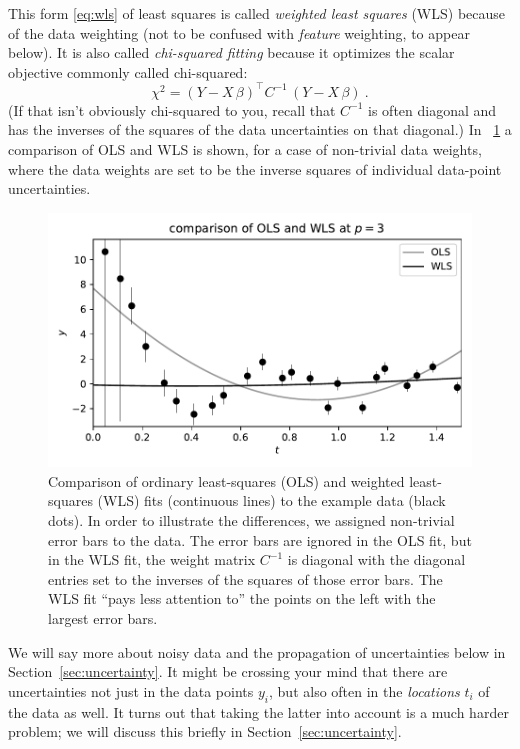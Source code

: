 \documentclass[12pt,letterpaper]{article}
\newlength{\figurewidth}
\newcommand{\sectionname}{Section}
\begin{document}
This form \eqref{eq:wls} of least squares is called \emph{weighted least squares} (WLS) because of the data weighting (not to be confused with \emph{feature} weighting, to appear below).
It is also called \emph{chi-squared fitting} because it optimizes the scalar objective commonly called chi-squared:
\begin{equation}
    \chi^2 = (Y - X\,\beta)^\top C^{-1}\,(Y - X\,\beta)
    ~.
\end{equation}
(If that isn't obviously chi-squared to you, recall that $C^{-1}$ is often diagonal and has the inverses of the squares of the data uncertainties on that diagonal.)
In \figurename~\ref{fig:wls} a comparison of OLS and WLS is shown, for a case of non-trivial data weights, where the data weights are set to be the inverse squares of individual data-point uncertainties.
\begin{figure}[t]
    \begin{mdframed}
    \includegraphics[width=\figurewidth]{paper/WLS.pdf}
    \caption{Comparison of ordinary least-squares (OLS) and weighted least-squares (WLS) fits (continuous lines) to the example data (black dots). In order to illustrate the differences, we assigned non-trivial error bars to the data. The error bars are ignored in the OLS fit, but in the WLS fit, the weight matrix $C^{-1}$ is diagonal with the diagonal entries set to the inverses of the squares of those error bars. The WLS fit ``pays less attention to'' the points on the left with the largest error bars.}
    \label{fig:wls}
    \end{mdframed}
\end{figure}

We will say more about noisy data and the propagation of uncertainties below in \sectionname~\ref{sec:uncertainty}.
It might be crossing your mind that there are uncertainties not just in the data points $y_i$, but also often in the \emph{locations} $t_i$ of the data as well. It turns out that taking the latter into account is a much harder problem; we will discuss this briefly in \sectionname~\ref{sec:uncertainty}.
\end{document}
